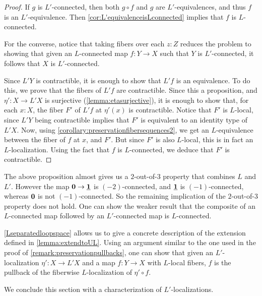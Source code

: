 \begin{proof}
    If $g$ is $L'$-connected, then both $g\circ f$ and $g$ are $L'$-equivalences,
    and thus $f$ is an $L'$-equivalence. Then \cref{cor:L'equivalenceisLconnected}
    implies that $f$ is $L$-connected.

    For the converse, notice that taking fibers over each $z:Z$ reduces the problem
    to showing that given an $L$-connected map $f : Y \to X$
    such that $Y$ is $L'$-connected, it follows that $X$ is $L'$-connected.

    Since $L'Y$ is contractible, it is enough to show that $L'f$ is an equivalence.
    To do this, we prove that the fibers of $L'f$ are contractible.
    Since this a proposition, and $\eta' : X \to L'X$ is surjective (\cref{lemma:etasurjective}), it is enough
    to show that, for each $x : X$, the fiber $F'$ of $L'f$ at $\eta'(x)$ is contractible.
    Notice that $F'$ is $L$-local, since $L' Y$ being contractible implies that $F'$ is
    equivalent to an identity type of $L' X$.
    Now, using \cref{corollary:preservationfibersequences2},
    we get an $L$-equivalence between the fiber of $f$ at $x$, and $F'$.
    But since $F'$ is also $L$-local, this is in fact an $L$-localization.
    Using the fact that $f$ is $L$-connected, we deduce that $F'$ is contractible.
\end{proof}

\begin{rmk}
The above proposition almost gives us a $2$-out-of-$3$ property that combines $L$ and $L'$.
However the map $\mathbf{0} \to \underline{\mathbf{1}}$ is $(-2)$-connected, and $\underline{\mathbf{1}}$ is $(-1)$-connected,
whereas $\mathbf{0}$ is not $(-1)$-connected. So the remaining implication of the $2$-out-of-$3$ property
does not hold. One can show the weaker result that the composite of an $L$-connected map followed by
an $L'$-connected map is $L$-connected.
\end{rmk}

\begin{rmk}
\cref{Lseparatedloopspace} allows us to give a concrete description of
the extension defined in \cref{lemma:extendtoUL}.
Using an argument similar to the one used in the proof of \cref{remark:preservationpullbacks},
one can show that given an $L'$-localization $\eta' : X \to L' X$
and a map $f: Y \to X$ with $L$-local fibers, $f$ is the pullback of
the fiberwise $L$-localization of $\eta' \circ f$.
\end{rmk}

We conclude this section with a characterization of $L'$-localizations.

